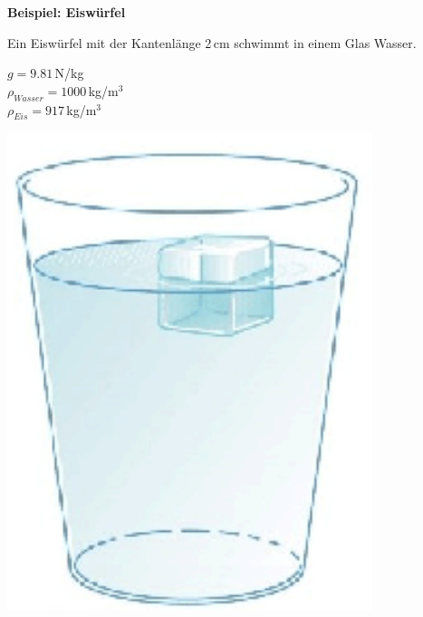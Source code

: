 \documentclass[11pt]{article}
\begin{document}
\newpage

\textbf{Beispiel: Eiswürfel}

\begin{minipage}{0.8\textwidth}
Ein Eiswürfel mit der Kantenlänge 2\,cm schwimmt in einem Glas Wasser.

	$g = 9.81\,$N/kg\\
	$\rho_{Wasser} = 1000\,$kg/m$^3$ \\
	$\rho_{Eis} = 917\,$kg/m$^3$
\end{minipage}
\begin{minipage}{0.2\textwidth}
    \begin{flushright}
        \includegraphics[width=0.8\textwidth]{images/Beispiel-Eis.png}
    \end{flushright}

\end{minipage}
\end{document}
